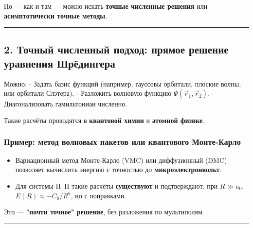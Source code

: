 \documentclass[11pt]{article}
\providecommand{\tightlist}{%
      \setlength{\itemsep}{0pt}\setlength{\parskip}{0pt}}
\begin{document}
Но --- как и там --- можно искать \textbf{точные численные решения} или
\textbf{асимптотически точные методы}.

\begin{center}\rule{0.5\linewidth}{\linethickness}\end{center}

\subsection{2. Точный численный подход: прямое решение уравнения
Шрёдингера}\label{ux442ux43eux447ux43dux44bux439-ux447ux438ux441ux43bux435ux43dux43dux44bux439-ux43fux43eux434ux445ux43eux434-ux43fux440ux44fux43cux43eux435-ux440ux435ux448ux435ux43dux438ux435-ux443ux440ux430ux432ux43dux435ux43dux438ux44f-ux448ux440ux451ux434ux438ux43dux433ux435ux440ux430}

Можно: - Задать базис функций (например, гауссовы орбитали, плоские
волны, или орбитали Слэтера), - Разложить волновую функцию
\(\Psi(\vec{r}_1, \vec{r}_2)\), - Диагонализовать гамильтониан численно.

Такие расчёты проводятся в \textbf{квантовой химии} и \textbf{атомной
физике}.

\subsubsection{\texorpdfstring{Пример: метод \textbf{волновых пакетов}
или \textbf{квантового
Монте-Карло}}{Пример: метод волновых пакетов или квантового Монте-Карло}}\label{ux43fux440ux438ux43cux435ux440-ux43cux435ux442ux43eux434-ux432ux43eux43bux43dux43eux432ux44bux445-ux43fux430ux43aux435ux442ux43eux432-ux438ux43bux438-ux43aux432ux430ux43dux442ux43eux432ux43eux433ux43e-ux43cux43eux43dux442ux435-ux43aux430ux440ux43bux43e}

\begin{itemize}
\tightlist
\item
  Вариационный метод Монте-Карло (VMC) или диффузионный (DMC) позволяет
  вычислить энергию с точностью до \textbf{микроэлектронвольт}.
\item
  Для системы H--H такие расчёты \textbf{существуют} и подтверждают: при
  \(R \gg a_0\), \(E(R) \approx -C_6 / R^6\), но с поправками.
\end{itemize}

Это --- \textbf{"почти точное" решение}, без разложения по мультиполям.

\begin{center}\rule{0.5\linewidth}{\linethickness}\end{center}
\end{document}
